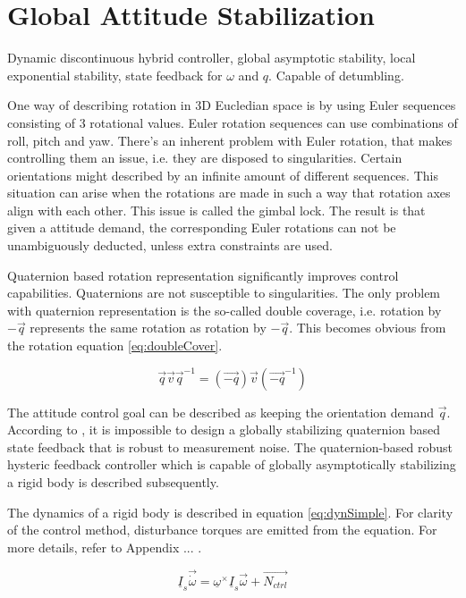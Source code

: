 \section{Global Attitude Stabilization}

Dynamic discontinuous hybrid controller, global asymptotic stability, local exponential stability, state feedback for $\omega$ and $q$. Capable of detumbling. \cite{globalAttController}

One way of describing rotation in 3D Eucledian space is by using Euler sequences consisting of 3 rotational values. Euler rotation sequences can use combinations of roll, pitch and yaw. There's an inherent problem with Euler rotation, that makes controlling them an issue, i.e. they are disposed to singularities. Certain orientations might described by an infinite amount of different sequences. This situation can arise when the rotations are made in such a way that rotation axes align with each other. This issue is called the gimbal lock. The result is that given a attitude demand, the corresponding Euler rotations can not be unambiguously deducted, unless extra constraints are used.

Quaternion based rotation representation significantly improves control capabilities. Quaternions are not susceptible to singularities. The only problem with quaternion representation is the so-called double coverage, i.e. rotation by $-\vec{q}$ represents the same rotation as rotation by $-\vec{q}$. This becomes obvious from the rotation equation \ref{eq:doubleCover}.

\begin{equation}
\label{eq:doubleCover}
\vec{q} \vec{v} \vec{q}^{-1} = 	(\vec{-q}) \vec{v} (\vec{-q}^{-1})
\end{equation} 

The attitude control goal can be described as keeping the orientation demand $\vec{q}$. According to  \cite{globalAttController}, it is impossible to design a globally stabilizing quaternion based state feedback that is robust to measurement noise. The quaternion-based robust hysteric feedback controller which is capable of globally asymptotically stabilizing a rigid body is described subsequently.

The dynamics of a rigid body is described in equation \ref{eq:dynSimple}. For clarity of the control method, disturbance torques are emitted from the equation. For more details, refer to Appendix ... .

\begin{equation}
\label{eq:dynSimple}
\underline{I}_s \vec{\dot{\omega}} = \underline{\omega}^\times \underline{I}_s \vec{\omega} + \vec{N_{ctrl}}
\end{equation}

